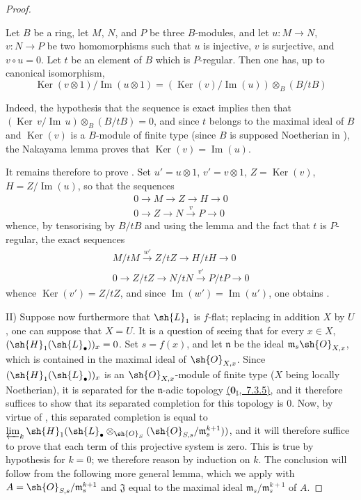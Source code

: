 \begin{proof}
\begin{lemma}[12.3.3.3]
\label{IV.12.3.3.3}
Let $B$ be a ring, let $M$, $N$, and $P$ be three $B$-modules, and let
$u:M\to N$, $v:N\to P$ be two homomorphisms such that $u$ is injective, $v$ is surjective, and $v\circ u=0$.
Let $t$ be an element of $B$ which is $P$-regular.
Then one has, up to canonical isomorphism,
\begin{equation}
\tag{12.3.3.4}
\label{IV.12.3.3.4}
\operatorname{Ker}(v\otimes 1)/\operatorname{Im}(u\otimes 1) = (\operatorname{Ker}(v)/\operatorname{Im}(u))\otimes_B(B/tB)
\end{equation}
\end{lemma}

Indeed, the hypothesis that the sequence  is exact implies then that $(\operatorname{Ker}\,v/\operatorname{Im}\,u)\otimes_B(B/tB)=0$, and since $t$ belongs to the maximal ideal of $B$ and $\operatorname{Ker}(v)$ is a $B$-module of finite type (since $B$ is supposed Noetherian in ), the Nakayama lemma proves that $\operatorname{Ker}(v)=\operatorname{Im}(u)$.

It remains therefore to prove .
Set $u'=u\otimes 1$, $v'=v\otimes 1$, $Z=\operatorname{Ker}(v)$, $H=Z/\operatorname{Im}(u)$, so that the sequences
\begin{gather*}
  0\to M\to Z\to H\to 0\\
  0\to Z\to N\xrightarrow{v} P\to 0
\end{gather*}
whence, by tensorising by $B/tB$ and using the lemma  and the fact that $t$ is $P$-regular, the exact sequences
\begin{gather*}
  M/tM \xrightarrow{w'} Z/tZ \to H/tH \to 0\\
  0\to Z/tZ \to N/tN \xrightarrow{v'} P/tP \to 0
\end{gather*}
whence $\operatorname{Ker}(v')=Z/tZ$, and since $\operatorname{Im}(w')=\operatorname{Im}(u')$, one obtains .

\medskip
II) Suppose now furthermore that $\sh{L}_1$ is $f$-flat; replacing in addition $X$ by $U$, one can suppose that $X=U$.
It is a question of seeing that for every $x\in X$, $(\sh{H}_1(\sh{L}_\bullet))_x=0$.
Set $s=f(x)$, and let $\mathfrak{n}$ be the ideal $\mathfrak{m}_s\sh{O}_{X,x}$, which is contained in the maximal ideal of $\sh{O}_{X,x}$.
Since $(\sh{H}_1(\sh{L}_\bullet))_x$ is an $\sh{O}_{X,x}$-module of finite type ($X$ being locally Noetherian), it is separated for the $\mathfrak{n}$-adic topology \hyperref[0.7.3.5]{($\mathbf{0}_{\mathrm{I}}$,~7.3.5)}, and it therefore suffices to show that its separated completion for this topology is $0$.
Now, by virtue of , this separated completion is equal to
$\varprojlim_k\sh{H}_1(\sh{L}_\bullet\otimes_{\sh{O}_S}(\sh{O}_{S,s}/\mathfrak{m}_s^{k+1}))$, and it will therefore suffice to prove that each term of this projective system is zero.
This is true by hypothesis for $k=0$; we therefore reason by induction on $k$.
The conclusion will follow from the following more general lemma, which we apply with $A=\sh{O}_{S,s}/\mathfrak{m}_s^{k+1}$ and $\mathfrak{J}$ equal to the maximal ideal $\mathfrak{m}_s/\mathfrak{m}_s^{k+1}$ of $A$.


\end{proof}
